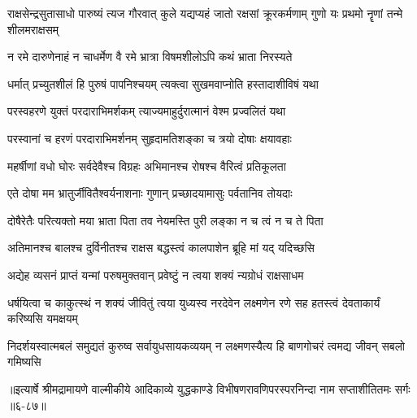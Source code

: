 \threelineshloka
{राक्षसेन्द्रसुतासाधो पारुष्यं त्यज गौरवात्}
{कुले यद्यप्यहं जातो रक्षसां क्रूरकर्मणाम्}
{गुणो यः प्रथमो नॄणां तन्मे शीलमराक्षसम्} %

\twolineshloka
{न रमे दारुणेनाहं न चाधर्मेण वै रमे}
{भ्रात्रा विषमशीलोऽपि कथं भ्राता निरस्यते} %

\twolineshloka
{धर्मात् प्रच्युतशीलं हि पुरुषं पापनिश्चयम्}
{त्यक्त्वा सुखमवाप्नोति हस्तादाशीविषं यथा} %

\twolineshloka
{परस्वहरणे युक्तं परदाराभिमर्शकम्}
{त्याज्यमाहुर्दुरात्मानं वेश्म प्रज्वलितं यथा} %

\twolineshloka
{परस्वानां च हरणं परदाराभिमर्शनम्}
{सुहृदामतिशङ्का च त्रयो दोषाः क्षयावहाः} %

\twolineshloka
{महर्षीणां वधो घोरः सर्वदेवैश्च विग्रहः}
{अभिमानश्च रोषश्च वैरित्वं प्रतिकूलता} %

\twolineshloka
{एते दोषा मम भ्रातुर्जीवितैश्वर्यनाशनाः}
{गुणान् प्रच्छादयामासुः पर्वतानिव तोयदाः} %

\twolineshloka
{दोषैरेतैः परित्यक्तो मया भ्राता पिता तव}
{नेयमस्ति पुरी लङ्का न च त्वं न च ते पिता} %

\twolineshloka
{अतिमानश्च बालश्च दुर्विनीतश्च राक्षस}
{बद्धस्त्वं कालपाशेन ब्रूहि मां यद् यदिच्छसि} %

\twolineshloka
{अद्येह व्यसनं प्राप्तं यन्मां परुषमुक्तवान्}
{प्रवेष्टुं न त्वया शक्यं न्यग्रोधं राक्षसाधम} %

\threelineshloka
{धर्षयित्वा च काकुत्स्थं न शक्यं जीवितुं त्वया}
{युध्यस्व नरदेवेन लक्ष्मणेन रणे सह}
{हतस्त्वं देवताकार्यं करिष्यसि यमक्षयम्} %

\twolineshloka
{निदर्शयस्वात्मबलं समुद्यतं कुरुष्व सर्वायुधसायकव्ययम्}
{न लक्ष्मणस्यैत्य हि बाणगोचरं त्वमद्य जीवन् सबलो गमिष्यसि} %


॥इत्यार्षे श्रीमद्रामायणे वाल्मीकीये आदिकाव्ये युद्धकाण्डे विभीषणरावणिपरस्परनिन्दा नाम सप्ताशीतितमः सर्गः ॥६-८७॥
